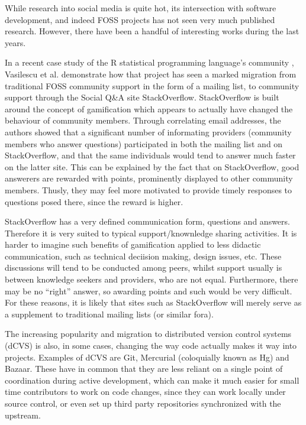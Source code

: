 \documentclass[a4paper,11pt]{article} %
\begin{document}
While research into social media is quite hot, its intersection with
software development, and indeed FOSS projects has not seen very much
published research. However, there have been a handful of interesting
works during the last years.

In a recent case study of the R statistical programming language's
community \cite{Vasilescu14StackOverflow}, Vasilescu et
al. demonstrate how that project has seen a marked migration from
traditional FOSS community support in the form of a mailing list, to
community support through the Social Q\&{}A site
StackOverflow. StackOverflow is built around the concept of
gamification\cite{deterding2011game} which appears to actually have
changed the behaviour of community members. Through correlating email
addresses, the authors showed that a significant number of informating
providers (community members who answer questions) participated in
both the mailing list and on StackOverflow, and that the same
individuals would tend to answer much faster on the latter site. This
can be explained by the fact that on StackOverflow, good answerers are
rewarded with points, prominently displayed to other community
members. Thusly, they may feel more motivated to provide timely
responses to questions posed there, since the reward is higher.


StackOverflow has a very defined communication form, questions and
answers. Therefore it is very suited to typical support/knownledge
sharing activities. It is harder to imagine such benefits of
gamification applied to less didactic communication, such as technical
deciision making, design issues, etc. These discussions will tend to
be conducted among peers, whilst support usually is between knowledge
seekers and providers, who are not equal. Furthermore, there may be no
``right'' answer, so awarding points and such would be very
difficult. For these reasons, it is likely that sites such as
StackOverflow will merely serve as a supplement to traditional mailing
lists (or similar fora).


The increasing popularity and migration to distributed version control
systems (dCVS) is also, in some cases, changing the way code actually
makes it way into projects. Examples of dCVS are Git, Mercurial
(coloquially known as Hg) and Bazaar. These have in common that they
are less reliant on a single point of coordination during active
development, which can make it much easier for small time contributors
to work on code changes, since they can work locally under source
control, or even set up third party repositories synchronized with the
upstream.
\end{document}
